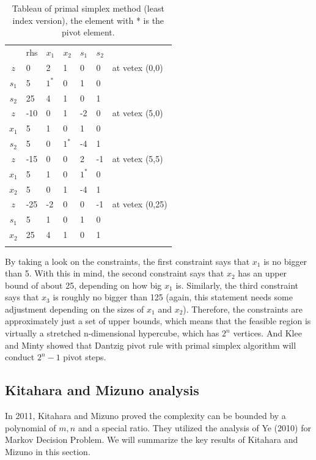 \documentclass[11pt]{article}
\begin{document}
\begin{table}[H]
\caption{Tableau of primal simplex method (least index version), the element with * is the pivot element. }
\label{Table: tableau}
\centering
\begin{tabular}{c|llllll}
   & rhs & $x_1$ & $x_2$ & $s_1$ & $s_2$ &                 \\ \cline{1-6}
$z$  & 0   & 2  & 1  & 0  & 0  & at vetex (0,0)  \\
$s_1$ & 5   & $1^*$  & 0  & 1  & 0  &                 \\
$s_2$ & 25  & 4  & 1  & 0  & 1  &                 \\ \hhline{======}
$z$  & -10 & 0  & 1  & -2 & 0  & at vetex (5,0)  \\
$x_1$ & 5   & 1  & 0  & 1  & 0  &                 \\
$s_2$ & 5   & 0  & $1^*$  & -4 & 1  &                 \\ \hhline{======}
$z$  & -15 & 0  & 0  & 2  & -1 & at vetex (5,5)  \\
$x_1$ & 5   & 1  & 0  & $1^*$  & 0  &                 \\
$x_2$ & 5   & 0  & 1  & -4 & 1  &                 \\ \hhline{======}
$z$  & -25 & -2 & 0  & 0  & -1 & at vetex (0,25) \\
$s_1$ & 5   & 1  & 0  & 1  & 0  &                 \\
$x_2$ & 25  & 4  & 1  & 0  & 1  &                 \\ \hhline{======}
\end{tabular}
\end{table}
By taking a look on the constraints, the first constraint says that $x_1$ is no bigger than 5. With this in mind, the second constraint says that $x_2$ has an upper bound of about 25, depending on how big $x_1$ is. Similarly, the third constraint says that $x_3$ is roughly no bigger than 125 (again, this statement needs some adjustment depending on the sizes of $x_1$ and $x_2$). Therefore, the constraints are approximately just a set of upper bounds, which means that the feasible region is virtually a stretched n-dimensional hypercube, which has $2^n$ vertices. And Klee and Minty \cite{klee1972good} showed that Dantzig pivot rule with primal simplex algorithm will conduct $2^n -1$ pivot steps.

\subsection{Kitahara and Mizuno analysis}
In 2011, Kitahara and Mizuno \cite{kitahara2013bound} proved the complexity can be bounded by a polynomial of $m, n$ and a special ratio. They utilized the analysis of Ye (2010) \cite{ye2010simplex} for Markov Decision Problem. We will summarize the key results of Kitahara and Mizuno \cite{kitahara2013bound} in this section. 
\end{document}

